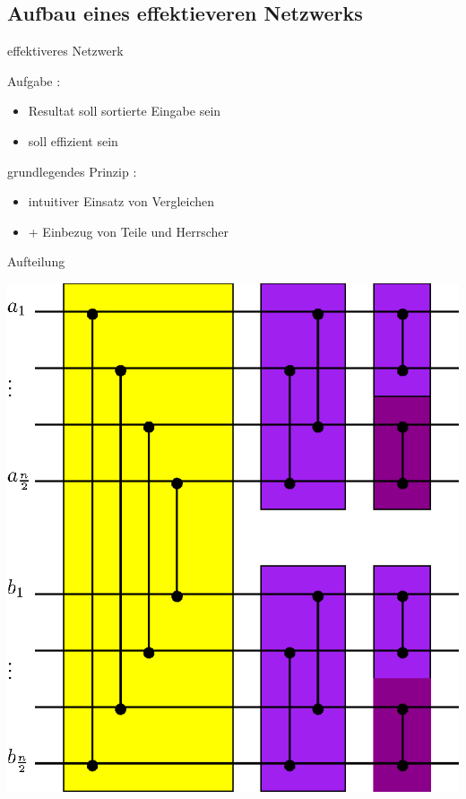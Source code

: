 \documentclass[ucs,9pt]{beamer}
\begin{document}
\subsection*{Aufbau eines effektieveren Netzwerks}
\begin{frame}{effektiveres Netzwerk}
    \begin{semiverbatim}[fontfamily=ucs]
    		 { }
         {Aufgabe :
            \begin{itemize}
                \item Resultat soll sortierte Eingabe sein
                \item \alert{soll effizient sein}
            \end{itemize}}
         {grundlegendes Prinzip :
            \begin{itemize}
                \item intuitiver Einsatz von Vergleichen
                \item[]\alert{+ Einbezug von Teile und Herrscher}
            \end{itemize}}
    \end{semiverbatim}
\end{frame}

\begin{frame}{Aufteilung}
\begin{center}
\includegraphics[scale=0.6]{bitonmischer.eps}
\end{center}
\end{frame}
\end{document}
